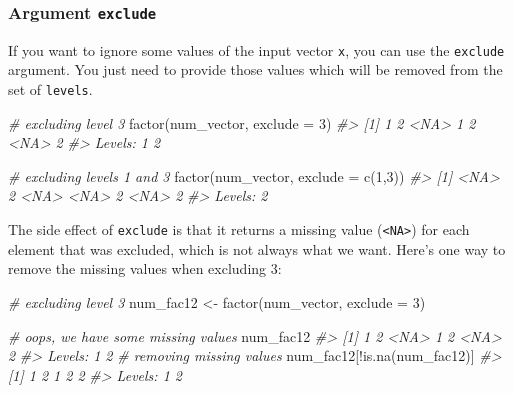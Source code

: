 \documentclass[
]{book}
\newenvironment{Shaded}{\begin{snugshade}}{\end{snugshade}}
\newcommand{\AttributeTok}[1]{\textcolor[rgb]{0.77,0.63,0.00}{#1}}
\newcommand{\CommentTok}[1]{\textcolor[rgb]{0.56,0.35,0.01}{\textit{#1}}}
\newcommand{\DecValTok}[1]{\textcolor[rgb]{0.00,0.00,0.81}{#1}}
\newcommand{\FunctionTok}[1]{\textcolor[rgb]{0.00,0.00,0.00}{#1}}
\newcommand{\NormalTok}[1]{#1}
\newcommand{\OtherTok}[1]{\textcolor[rgb]{0.56,0.35,0.01}{#1}}
\newcommand{\SpecialCharTok}[1]{\textcolor[rgb]{0.00,0.00,0.00}{#1}}
\begin{document}
\hypertarget{argument-exclude}{%
\subsubsection*{\texorpdfstring{Argument \texttt{exclude}}{Argument exclude}}\label{argument-exclude}}

If you want to ignore some values of the input vector \texttt{x}, you can use the
\texttt{exclude} argument. You just need to provide those values which will be removed
from the set of \texttt{levels}.

\begin{Shaded}
\begin{Highlighting}[]
\CommentTok{\# excluding level 3}
\FunctionTok{factor}\NormalTok{(num\_vector, }\AttributeTok{exclude =} \DecValTok{3}\NormalTok{)}
\CommentTok{\#\textgreater{} [1] 1    2    \textless{}NA\textgreater{} 1    2    \textless{}NA\textgreater{} 2   }
\CommentTok{\#\textgreater{} Levels: 1 2}

\CommentTok{\# excluding levels 1 and 3}
\FunctionTok{factor}\NormalTok{(num\_vector, }\AttributeTok{exclude =} \FunctionTok{c}\NormalTok{(}\DecValTok{1}\NormalTok{,}\DecValTok{3}\NormalTok{))}
\CommentTok{\#\textgreater{} [1] \textless{}NA\textgreater{} 2    \textless{}NA\textgreater{} \textless{}NA\textgreater{} 2    \textless{}NA\textgreater{} 2   }
\CommentTok{\#\textgreater{} Levels: 2}
\end{Highlighting}
\end{Shaded}

The side effect of \texttt{exclude} is that it returns a missing value (\texttt{\textless{}NA\textgreater{}}) for
each element that was excluded, which is not always what we want. Here's one
way to remove the missing values when excluding 3:

\begin{Shaded}
\begin{Highlighting}[]
\CommentTok{\# excluding level 3}
\NormalTok{num\_fac12 }\OtherTok{\textless{}{-}} \FunctionTok{factor}\NormalTok{(num\_vector, }\AttributeTok{exclude =} \DecValTok{3}\NormalTok{)}

\CommentTok{\# oops, we have some missing values}
\NormalTok{num\_fac12}
\CommentTok{\#\textgreater{} [1] 1    2    \textless{}NA\textgreater{} 1    2    \textless{}NA\textgreater{} 2   }
\CommentTok{\#\textgreater{} Levels: 1 2}
\CommentTok{\# removing missing values}
\NormalTok{num\_fac12[}\SpecialCharTok{!}\FunctionTok{is.na}\NormalTok{(num\_fac12)]}
\CommentTok{\#\textgreater{} [1] 1 2 1 2 2}
\CommentTok{\#\textgreater{} Levels: 1 2}
\end{Highlighting}
\end{Shaded}
\end{document}
